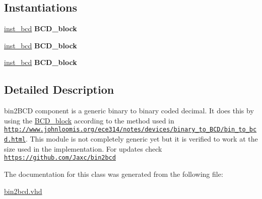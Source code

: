 \subsection*{Instantiations}
 \begin{DoxyCompactItemize}
\item 
\hypertarget{classbin2bcd_1_1converter_ab5107bcdc41f27ec9b85d6915d2b5aa4}{\hyperlink{classbin2bcd_1_1converter_ab5107bcdc41f27ec9b85d6915d2b5aa4}{inst\-\_\-bcd}  {\bfseries B\-C\-D\-\_\-block}   }\label{classbin2bcd_1_1converter_ab5107bcdc41f27ec9b85d6915d2b5aa4}

\item 
\hypertarget{classbin2bcd_1_1converter_ab5107bcdc41f27ec9b85d6915d2b5aa4}{\hyperlink{classbin2bcd_1_1converter_ab5107bcdc41f27ec9b85d6915d2b5aa4}{inst\-\_\-bcd}  {\bfseries B\-C\-D\-\_\-block}   }\label{classbin2bcd_1_1converter_ab5107bcdc41f27ec9b85d6915d2b5aa4}

\item 
\hypertarget{classbin2bcd_1_1converter_ab5107bcdc41f27ec9b85d6915d2b5aa4}{\hyperlink{classbin2bcd_1_1converter_ab5107bcdc41f27ec9b85d6915d2b5aa4}{inst\-\_\-bcd}  {\bfseries B\-C\-D\-\_\-block}   }\label{classbin2bcd_1_1converter_ab5107bcdc41f27ec9b85d6915d2b5aa4}

\end{DoxyCompactItemize}


\subsection{Detailed Description}
bin2\-B\-C\-D  component is a generic binary to binary coded decimal. It does this by using the \hyperlink{classBCD__block}{B\-C\-D\-\_\-block} according to the method used in \href{http://www.johnloomis.org/ece314/notes/devices/binary_to_BCD/bin_to_bcd.html}{\tt http\-://www.\-johnloomis.\-org/ece314/notes/devices/binary\-\_\-to\-\_\-\-B\-C\-D/bin\-\_\-to\-\_\-bcd.\-html}. This module is not completely generic yet but it is verified to work at the size used in the implementation. For updates check \href{https://github.com/Jaxc/bin2bcd}{\tt https\-://github.\-com/\-Jaxc/bin2bcd} 

The documentation for this class was generated from the following file\-:\begin{DoxyCompactItemize}
\item 
\hyperlink{bin2bcd_8vhd}{bin2bcd.\-vhd}\end{DoxyCompactItemize}
